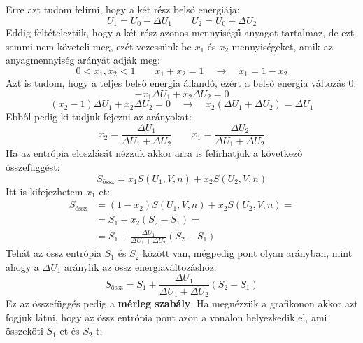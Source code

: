 \documentclass[../main.tex]{subfiles}
\begin{document}
Erre azt tudom felírni, hogy a két rész belső energiája:
\begin{equation}
    U_1 = U_0 - \Delta U_1 \qquad U_2 = U_0 + \Delta U_2
\end{equation}
Eddig feltételeztük, hogy a két rész azonos mennyiségű anyagot tartalmaz, de ezt semmi nem követeli meg, ezét vezessünk be $x_1$ és $x_2$ mennyiségeket, amik az anyagmennyiség arányát adják meg:
\begin{equation}
    0 < x_1, x_2 < 1 \qquad x_1 + x_2 = 1 \quad \rightarrow \quad x_1 = 1 - x_2
\end{equation}
Azt is tudom, hogy a teljes belső energia állandó, ezért a belső energia változás 0:
\begin{equation}
    -x_1 \Delta U_1 + x_2 \Delta U_2 = 0
\end{equation}
\begin{equation}
    (x_2 - 1) \Delta U_1 + x_2 \Delta U_2 = 0 \quad \to \quad x_2 (\Delta U_1 + \Delta U_2) = \Delta U_1
\end{equation}
Ebből pedig ki tudjuk fejezni az arányokat:
\begin{equation}
    x_2 = \frac{\Delta U_1}{\Delta U_1 + \Delta U_2} \qquad x_1 = \frac{\Delta U_2}{\Delta U_1 + \Delta U_2}
\end{equation}
Ha az entrópia eloszlását nézzük akkor arra is felírhatjuk a következő összefüggést:
\begin{equation}
    S_{\text{össz}} = x_1 S(U_1, V, n) + x_2 S(U_2, V, n)
\end{equation}
Itt is kifejezhetem $x_1$-et:
\begin{equation}
    \begin{aligned}
        S_{\text{össz}} &= (1 - x_2) S(U_1, V, n) + x_2 S(U_2, V, n) = \\
        &= S_1 + x_2 \left(S_2 - S_1\right) = \\
        &= S_1 + \frac{\Delta U_1}{\Delta U_1 + \Delta U_2} \left(S_2 - S_1\right)
    \end{aligned}
\end{equation}
Tehát az össz entrópia $S_1$ és $S_2$ között van, mégpedig pont olyan arányban, mint ahogy a $\Delta U_1$ aránylik az össz energiaváltozáshoz:
\begin{equation}
    S_{\text{össz}} = S_1 + \frac{\Delta U_1}{\Delta U_1 + \Delta U_2} \left(S_2 - S_1\right)
\end{equation}
Ez az összefüggés pedig a \textbf{mérleg szabály}. Ha megnézzük a grafikonon akkor azt fogjuk látni, hogy az össz entrópia pont azon a vonalon helyezkedik el, ami összeköti $S_1$-et és $S_2$-t:
\end{document}
